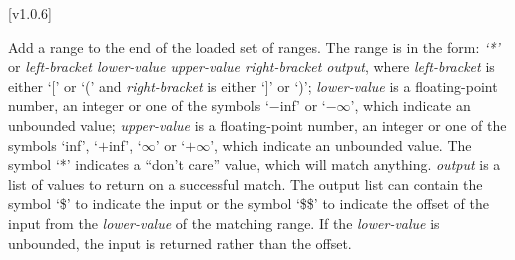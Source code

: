 [v1.0.6]






\objItemArgs{\ }

  \objListArgBegin
  \objListArgEnd

\objItemInlet{\ }

  \objListIOBegin
  \objListIOEnd

\objItemOutlet{\ }

  \objListIOBegin
  \objListIOEnd






\objItemCommands[]

  \objListCmdBegin

  Add a range to the end of the loaded set of ranges.
  The range is in the form: \emph{`*'} or \emph{left-bracket lower-value upper-value right-bracket output}, where
  \emph{left-bracket} is either `[' or `(' and \emph{right-bracket} is either `]' or `)';
  \emph{lower-value} is a floating-point number, an integer or one of the symbols `$-$inf' or
  `$-\infty$', which indicate an unbounded value;
  \emph{upper-value} is a floating-point number, an integer or one of the symbols
  `inf', `$+$inf', `$\infty$' or `$+\infty$', which indicate an unbounded value.
  The symbol `*' indicates a ``don't care'' value, which will match anything.
  \emph{output} is a list of values to return on a successful match.
  The output list can contain the symbol `\$' to indicate the input or the symbol `\$\$' to
  indicate the offset of the input from the \emph{lower-value} of the matching range.
  If the \emph{lower-value} is unbounded, the input is returned rather than the offset.
  
